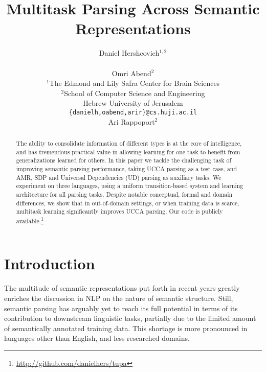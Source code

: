\documentclass[11pt,a4paper]{article}
\title{Multitask Parsing Across Semantic Representations}
\author{Daniel Hershcovich$^{1,2}$ \\
  \\\And
  Omri Abend$^2$ \\
  $^1$The Edmond and Lily Safra Center for Brain Sciences \\
  $^2$School of Computer Science and Engineering \\
  Hebrew University of Jerusalem \\
  \texttt{\{danielh,oabend,arir\}@cs.huji.ac.il}
  \\\And
  Ari Rappoport$^2$
}
\date{}
\begin{document}
\maketitle

\begin{abstract}
  The ability to consolidate information of different types
  is at the core of intelligence, and has tremendous practical value
  in allowing learning for one task to benefit from generalizations learned for others.
  In this paper we
  tackle the challenging task of improving semantic parsing
  performance, taking UCCA
  parsing as a test case, 
  and AMR, SDP and Universal Dependencies (UD) parsing as auxiliary tasks.
  We experiment on three languages,
  using a uniform transition-based system and learning 
  architecture for all parsing tasks.
  Despite notable conceptual, formal and domain differences,
  we show that in out-of-domain settings, or when training data is scarce,
  multitask learning significantly improves UCCA parsing.
  Our code is publicly available.\footnote{\url{http://github.com/danielhers/tupa}}
\end{abstract}

\section{Introduction}\label{sec:introduction}

The multitude of semantic representations put forth in recent years greatly enriches
the discussion in NLP on the nature of semantic structure.
Still, semantic parsing has arguably yet to reach its full 
potential in terms of its contribution to downstream linguistic tasks,
partially due to the limited amount of semantically annotated training data.
This shortage is more pronounced in 
languages other than English, and less researched domains.

\end{document}
